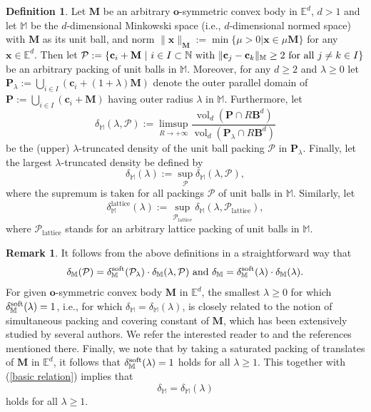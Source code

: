 \documentclass[11pt]{amsart}
\DeclareMathOperator{\vol}{vol}
\newcommand{\Eu}{\mathbb{E}}
\newcommand{\BB}{\mathbf{B}}
\newcommand{\M}{\mathbb{M}}
\newcommand{\N}{\mathbb{N}}
\newcommand{\MM}{\mathbf{M}}
\renewcommand{\P}{\mathcal{P}}
\newcommand{\x}{\mathbf{x}}
\renewcommand{\o}{\mathbf{o}}
\renewcommand{\c}{\mathbf{c}}
\theoremstyle{definition}
\newtheorem{definition}[theorem]{Definition}
\newtheorem{remark}[theorem]{Remark}
\numberwithin{equation}{section}
\begin{document}
\begin{definition}\label{defn:main}
Let $\MM$ be an arbitrary $\o$-symmetric convex body in $\Eu^d$, $d>1$ and let $\M$ be the $d$-dimensional Minkowski space (i.e., $d$-dimensional normed space) with $\MM$ as its unit ball, and norm $\| \x \|_{\MM}:=\min\{\mu>0 | \x\in\mu\MM\}$ for any $\x\in\Eu^d$. Then let $\P:=\{\c_i+\MM\ |\ i\in I\subset\N \ {\rm with}\ \|\c_j-\c_k\|_{\M} \ge 2\ {\rm for}\ {\rm all}\ j\neq k\in I\}$ be an arbitrary packing of unit balls in $\M$. Moreover, for any $d\ge 2$  and $\lambda\ge 0$ let $\mathbf{P}_{\lambda}:=\bigcup_{i\in I}(\c_i+(1+\lambda)\MM)$ denote the outer parallel domain of $\mathbf{P}:=\bigcup_{i\in I}(\c_i+\MM)$ having outer radius $\lambda$ in $\M$. Furthermore, let
$${\delta}_{\M}(\lambda , \P):=\limsup_{R\to +\infty}\frac{\vol_d(\mathbf{P}\cap R\BB^d)}{\vol_d(\mathbf{P}_{\lambda}\cap R\BB^d) }$$
be the (upper) {\rm $\lambda$-truncated density} of the unit ball packing $\P$ in $\mathbf{P}_{\lambda}$. Finally, let the largest $\lambda$-truncated density be defined by
$${\delta}_{\M}(\lambda):=\sup_{\P}{\delta}_{\M}(\lambda , \P) ,$$
where the supremum is taken for all packings $\P$ of unit balls in $\M$. Similarly, let $${\delta}_{\M}^{\mathrm{lattice}}(\lambda):=\sup_{\P_{\mathrm{lattice}}}{\delta}_{\M}(\lambda , \P_{\mathrm{lattice}}),$$
where $\P_{\mathrm{lattice}}$ stands for an arbitrary lattice packing of unit balls in $\M$. 
\end{definition}

\begin{remark} It follows from the above definitions in a straightforward way that
\begin{equation}\label{basic relation}
\delta_{\M}(\P)=\delta^{{\rm soft}}_{\M}(\P_{\lambda})\cdot {\delta}_{\M}(\lambda , \P)\ {\rm and}\ \delta_{\M}=\delta^{\rm soft}_{\M}(\lambda)\cdot{\delta}_{\M}(\lambda).
\end{equation}
For given $\o$-symmetric convex body $\MM$ in $\Eu^d$, the smallest $\lambda\geq 0$ for which $\delta^{\rm soft}_{\M}(\lambda)=1$, i.e., for which  $\delta_{\M}={\delta}_{\M}(\lambda)$, is closely related to the notion of simultaneous packing and covering constant of $\MM$, which has been extensively studied by several authors. We refer the interested reader to \cite{Zo2008} and the references mentioned there. Finally, we note that by taking a saturated packing of translates of $\MM$ in $\Eu^d$, it follows that $\delta^{\rm soft}_{\M}(\lambda)=1$ holds for all $\lambda\geq 1$. This together with (\ref{basic relation}) implies that
\begin{equation}\label{first}
\delta_{\M}={\delta}_{\M}(\lambda)
\end{equation}
holds for all $\lambda\geq 1$.
\end{remark}
\end{document}
